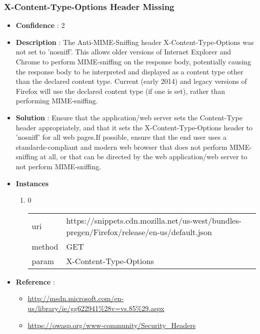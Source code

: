 \documentclass[10pt]{article}
\begin{document}
\subsubsection{X-Content-Type-Options Header Missing}
\begin{itemize}
\item[] \textbf{Confidence} : 2
\item[] \textbf{Description} : The Anti-MIME-Sniffing header X-Content-Type-Options was not set to 'nosniff'. This allows older versions of Internet Explorer and Chrome to perform MIME-sniffing on the response body, potentially causing the response body to be interpreted and displayed as a content type other than the declared content type. Current (early 2014) and legacy versions of Firefox will use the declared content type (if one is set), rather than performing MIME-sniffing.
\item[] \textbf{Solution} :  Ensure that the application/web server sets the Content-Type header appropriately, and that it sets the X-Content-Type-Options header to 'nosniff' for all web pages.If possible, ensure that the end user uses a standards-compliant and modern web browser that does not perform MIME-sniffing at all, or that can be directed by the web application/web server to not perform MIME-sniffing.
\item[] \textbf{Instances}
\begin{enumerate}
\item[] 0
\begin{tabular}{| l | p{12cm}}
uri & https://snippets.cdn.mozilla.net/us-west/bundles-pregen/Firefox/release/en-us/default.json \\
method & GET \\
param & X-Content-Type-Options \\
\end{tabular}
\end{enumerate}
\item[] \textbf{Reference} : 
\begin{itemize}
\item \url{http://msdn.microsoft.com/en-us/library/ie/gg622941\%28v=vs.85\%29.aspx}
\item \url{https://owasp.org/www-community/Security\_Headers}
\end{itemize}
\end{itemize}
\end{document}
